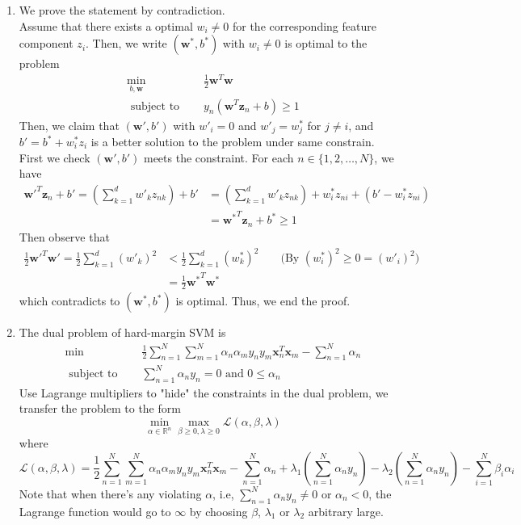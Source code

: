 \documentclass{article}
\begin{document}
\begin{CJK*}{UTF8}{bsmi}
\begin{normalsize}
\begin{enumerate}[label=\textbf{\arabic*}.]
        \item
        We prove the statement by contradiction.\\
        Assume that there exists a optimal $w_i \neq 0$ for the corresponding feature component $z_i$. Then, we write $(\mathbf{w}^*, b^*)$ with $w_i \neq 0$ is optimal to the problem
        \begin{align*}
            \min_{b, \mathbf{w}}\enspace \enspace& \frac{1}{2}\mathbf{w}^T\mathbf{w}\\
            \text{ subject to }\enspace \enspace& y_n(\mathbf{w}^T\mathbf{z}_n + b) \ge 1
        \end{align*}
        Then, we claim that $(\mathbf{w}', b')$ with $w'_i = 0$ and $w'_j = w^*_j$ for $j \neq i$, and $b' = b^* + w^*_i z_i$ is a better solution to the problem under same constrain.\\
        First we check $(\mathbf{w'},b')$ meets the constraint. For each $n \in \{1, 2, \dots, N\}$, we have
        \begin{align*} \mathbf{w'}^T \mathbf{z}_n + b' = \left(\sum_{k=1}^d w'_k z_{nk}\right) + b' &= \left(\sum_{k=1}^d w'_k z_{nk}\right) + w^*_i z_{ni} + (b' - w^*_i z_{ni}) \\
        &= \mathbf{w^*}^T\mathbf{z}_n + b^* \ge 1 \end{align*}
        Then observe that
        \begin{align*}
            \frac{1}{2}\mathbf{w'}^T\mathbf{w'} = \frac{1}{2}\sum_{k=1}^d (w'_k)^2 &< \frac{1}{2}\sum_{k=1}^d (w^*_k)^2 && \text{ (By $(w^*_i)^2 \ge 0 = (w'_i)^2$) }\\
            &= \frac{1}{2}\mathbf{w^*}^T\mathbf{w^*}
        \end{align*}
        which contradicts to $(\mathbf{w}^*, b^*)$ is optimal. Thus, we end the proof.
        
        \newpage
        \item The dual problem of hard-margin SVM is
        \begin{align*}
            \min\enspace \enspace& \frac{1}{2}\sum_{n=1}^N\sum_{m=1}^N \alpha_n \alpha_m y_n y_m \mathbf{x}_n^T\mathbf{x}_m - \sum_{n=1}^N \alpha_n\\
            \text{ subject to }\enspace \enspace& \sum_{n=1}^N \alpha_n y_n = 0 \text{ and }0\le\alpha_n
        \end{align*}
        Use Lagrange multipliers to "hide" the constraints in the dual problem, we transfer the problem to the form \[\min_{\alpha \in \mathbb{R}^n} \max_{\beta \ge 0, \lambda \ge 0} \mathcal{L}(\alpha, \beta, \lambda)\]
        where 
        \[ \mathcal{L}(\alpha, \beta, \lambda) = \frac{1}{2}\sum_{n=1}^N\sum_{m=1}^N \alpha_n \alpha_m y_n y_m \mathbf{x}_n^T\mathbf{x}_m - \sum_{n=1}^N \alpha_n + \lambda_1(\sum_{n=1}^N \alpha_n y_n) - \lambda_2(\sum_{n=1}^N \alpha_n y_n) - \sum_{i=1}^N \beta_i \alpha_i  \]
        Note that when there's any violating $\alpha$, i.e, $\sum_{n=1}^N \alpha_n y_n \neq 0$ or $\alpha_n < 0$, the Lagrange function would go to $\infty$ by choosing $\beta$, $\lambda_1$ or $\lambda_2$ arbitrary large.
        

\end{enumerate}
\end{normalsize}
\end{CJK*}
\end{document}
